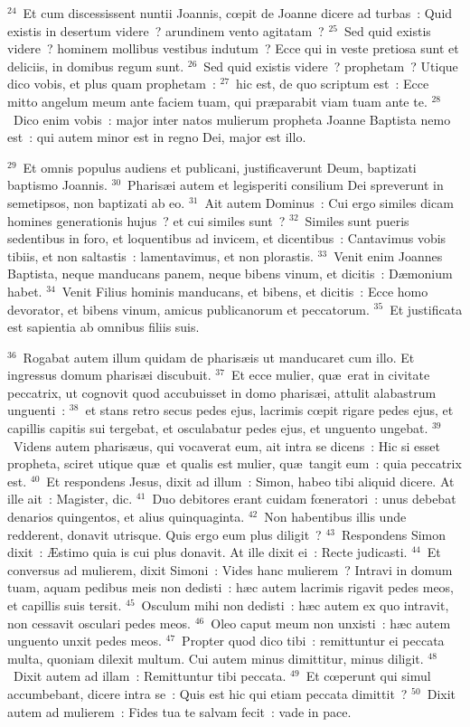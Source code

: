 ${}^{24}$~Et cum discessissent nuntii Joannis, cœpit de Joanne dicere ad turbas~: Quid existis in desertum videre~? arundinem vento agitatam~?
${}^{25}$~Sed quid existis videre~? hominem mollibus vestibus indutum~? Ecce qui in veste pretiosa sunt et deliciis, in domibus regum sunt.
${}^{26}$~Sed quid existis videre~? prophetam~? Utique dico vobis, et plus quam prophetam~:
${}^{27}$~hic est, de quo scriptum est~: Ecce mitto angelum meum ante faciem tuam, qui pr\ae parabit viam tuam ante te.
${}^{28}$~Dico enim vobis~: major inter natos mulierum propheta Joanne Baptista nemo est~: qui autem minor est in regno Dei, major est illo.


${}^{29}$~Et omnis populus audiens et publicani, justificaverunt Deum, baptizati baptismo Joannis.
${}^{30}$~Pharis\ae i autem et legisperiti consilium Dei spreverunt in semetipsos, non baptizati ab eo.
${}^{31}$~Ait autem Dominus~: Cui ergo similes dicam homines generationis hujus~? et cui similes sunt~?
${}^{32}$~Similes sunt pueris sedentibus in foro, et loquentibus ad invicem, et dicentibus~: Cantavimus vobis tibiis, et non saltastis~: lamentavimus, et non plorastis.
${}^{33}$~Venit enim Joannes Baptista, neque manducans panem, neque bibens vinum, et dicitis~: D\ae monium habet.
${}^{34}$~Venit Filius hominis manducans, et bibens, et dicitis~: Ecce homo devorator, et bibens vinum, amicus publicanorum et peccatorum.
${}^{35}$~Et justificata est sapientia ab omnibus filiis suis.


${}^{36}$~Rogabat autem illum quidam de pharis\ae is ut manducaret cum illo. Et ingressus domum pharis\ae i discubuit.
${}^{37}$~Et ecce mulier, qu\ae\ erat in civitate peccatrix, ut cognovit quod accubuisset in domo pharis\ae i, attulit alabastrum unguenti~:
${}^{38}$~et stans retro secus pedes ejus, lacrimis cœpit rigare pedes ejus, et capillis capitis sui tergebat, et osculabatur pedes ejus, et unguento ungebat.
${}^{39}$~Videns autem pharis\ae us, qui vocaverat eum, ait intra se dicens~: Hic si esset propheta, sciret utique qu\ae\ et qualis est mulier, qu\ae\ tangit eum~: quia peccatrix est.
${}^{40}$~Et respondens Jesus, dixit ad illum~: Simon, habeo tibi aliquid dicere. At ille ait~: Magister, dic.
${}^{41}$~Duo debitores erant cuidam fœneratori~: unus debebat denarios quingentos, et alius quinquaginta.
${}^{42}$~Non habentibus illis unde redderent, donavit utrisque. Quis ergo eum plus diligit~?
${}^{43}$~Respondens Simon dixit~: \AE stimo quia is cui plus donavit. At ille dixit ei~: Recte judicasti.
${}^{44}$~Et conversus ad mulierem, dixit Simoni~: Vides hanc mulierem~? Intravi in domum tuam, aquam pedibus meis non dedisti~: h\ae c autem lacrimis rigavit pedes meos, et capillis suis tersit.
${}^{45}$~Osculum mihi non dedisti~: h\ae c autem ex quo intravit, non cessavit osculari pedes meos.
${}^{46}$~Oleo caput meum non unxisti~: h\ae c autem unguento unxit pedes meos.
${}^{47}$~Propter quod dico tibi~: remittuntur ei peccata multa, quoniam dilexit multum. Cui autem minus dimittitur, minus diligit.
${}^{48}$~Dixit autem ad illam~: Remittuntur tibi peccata.
${}^{49}$~Et cœperunt qui simul accumbebant, dicere intra se~: Quis est hic qui etiam peccata dimittit~?
${}^{50}$~Dixit autem ad mulierem~: Fides tua te salvam fecit~: vade in pace.


